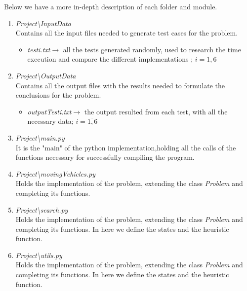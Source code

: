 \documentclass{article}
\begin{document}
\newpage

Below we have a more in-depth description of each folder and module. 
\newline

\begin{enumerate}[label=\Roman*]
  \item \emph{Project\textbackslash InputData}\\
  Contains all the input files needed to generate test cases for the problem.
    \begin{itemize}
        \item \emph{testi.txt}$\rightarrow$ all the tests generated randomly, used to research the time execution and compare the different implementations ; $i=\overline{1,6}$
    \end{itemize}
    
    \item \emph{Project\textbackslash OutputData}\\
    Contains all the output files with the results needed to formulate the conclusions for the problem.
    \begin{itemize}
        \item \emph{outputTesti.txt}$\rightarrow$ the output resulted from each test, with all the necessary data; $i=\overline{1,6}$
    \end{itemize}
    
    \item \emph{Project\textbackslash main.py}\\
   It is the "main" of the python implementation,holding all the calls of the functions necessary for successfully compiling the program.

     \item \emph{Project\textbackslash movingVehicles.py}\\
   Holds the implementation of the problem, extending the class \emph{Problem} and completing its functions.
   
   \item \emph{Project\textbackslash search.py}\\
   Holds the implementation of the problem, extending the class \emph{Problem} and completing its functions. In here we define the states and the heuristic function.
   
   \item \emph{Project\textbackslash utils.py}\\
   Holds the implementation of the problem, extending the class \emph{Problem} and completing its functions. In here we define the states and the heuristic function.
   
\end{enumerate}
\end{document}
